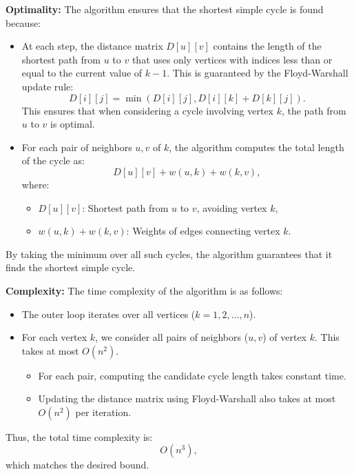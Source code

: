 \textbf{Optimality:} The algorithm ensures that the shortest simple cycle is found because:
\begin{itemize}
    \item At each step, the distance matrix \( D[u][v] \) contains the length of the shortest path from \( u \) to \( v \) that uses only vertices with indices less than or equal to the current value of \( k-1 \). This is guaranteed by the Floyd-Warshall update rule:
    \[
    D[i][j] = \min(D[i][j], D[i][k] + D[k][j]).
    \]
    This ensures that when considering a cycle involving vertex \( k \), the path from \( u \) to \( v \) is optimal.
    \item For each pair of neighbors \( u, v \) of \( k \), the algorithm computes the total length of the cycle as:
    \[
    D[u][v] + w(u, k) + w(k, v),
    \]
    where:
    \begin{itemize}
        \item \( D[u][v] \): Shortest path from \( u \) to \( v \), avoiding vertex \( k \),
        \item \( w(u, k) + w(k, v) \): Weights of edges connecting vertex \( k \).
    \end{itemize}
\end{itemize}
By taking the minimum over all such cycles, the algorithm guarantees that it finds the shortest simple cycle.

\textbf{Complexity:} The time complexity of the algorithm is as follows:
\begin{itemize}
    \item The outer loop iterates over all vertices (\( k = 1, 2, ..., n \)).
    \item For each vertex \( k \), we consider all pairs of neighbors (\( u, v \)) of vertex \( k \). This takes at most \( O(n^2) \).
    \begin{itemize}
        \item For each pair, computing the candidate cycle length takes constant time.
        \item Updating the distance matrix using Floyd-Warshall also takes at most \( O(n^2) \) per iteration.
    \end{itemize}
\end{itemize}
Thus, the total time complexity is:
\[
O(n^3),
\]
which matches the desired bound.
